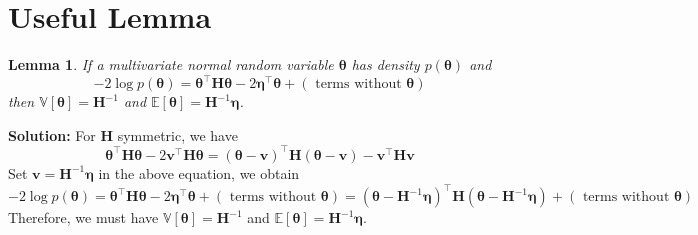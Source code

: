 \documentclass[11pt]{article}
\theoremstyle{plain} %
\newtheorem{lemma}[theorem]{Lemma}
\newenvironment{solution}
{\color{C2}\normalfont\begin{framed}\begingroup\textbf{Solution:} }
  {\endgroup\end{framed}}
\theoremstyle{remark}
\begin{document}
\begin{center}

  {}
\end{center}
\vspace{2em}

\tableofcontents

\section*{Useful Lemma}
\begin{lemma}\label{lemma: gaussian}
  If a multivariate normal random variable $\boldsymbol{\theta}$ has density $p(\boldsymbol{\theta})$ and
$$
-2 \log p(\boldsymbol{\theta})=\boldsymbol{\theta}^\top \boldsymbol{H} \boldsymbol{\theta}-2 \boldsymbol{\eta}^\top \boldsymbol{\theta}+(\text { terms without } \boldsymbol{\theta})
$$
then $\mathbb{V}[\boldsymbol{\theta}]=\boldsymbol{H}^{-1}$ and $\mathbb{E} [\boldsymbol{\theta}] =\boldsymbol{H}^{-1} \boldsymbol{\eta}$.
\end{lemma}
\begin{solution}
  For $\boldsymbol{H}$ symmetric, we have
  $$
  \boldsymbol{\theta}^\top \boldsymbol{H} \boldsymbol{\theta}-2 \boldsymbol{v}^\top \boldsymbol{H} \boldsymbol{\theta}=(\boldsymbol{\theta}-\boldsymbol{v})^\top \boldsymbol{H}(\boldsymbol{\theta}-\boldsymbol{v})-\boldsymbol{v}^\top \boldsymbol{H} \boldsymbol{v}
  $$
  Set $\boldsymbol{v}= \boldsymbol{H}^{-1} \boldsymbol{\eta}$ in the above equation, we obtain
  $$
  -2 \log p(\boldsymbol{\theta})=\boldsymbol{\theta}^\top \boldsymbol{H} \boldsymbol{\theta}-2 \boldsymbol{\eta}^\top \boldsymbol{\theta}+(\text { terms without } \boldsymbol{\theta}) = (\boldsymbol{\theta}-\boldsymbol{H}^{-1} \boldsymbol{\eta})^\top \boldsymbol{H}(\boldsymbol{\theta}-\boldsymbol{H}^{-1} \boldsymbol{\eta}) + (\text { terms without } \boldsymbol{\theta})
  $$
  Therefore, we must have $\mathbb{V}[\boldsymbol{\theta}]=\boldsymbol{H}^{-1}$ and $\mathbb{E} [\boldsymbol{\theta}] =\boldsymbol{H}^{-1} \boldsymbol{\eta}$.
\end{solution}
\end{document}
